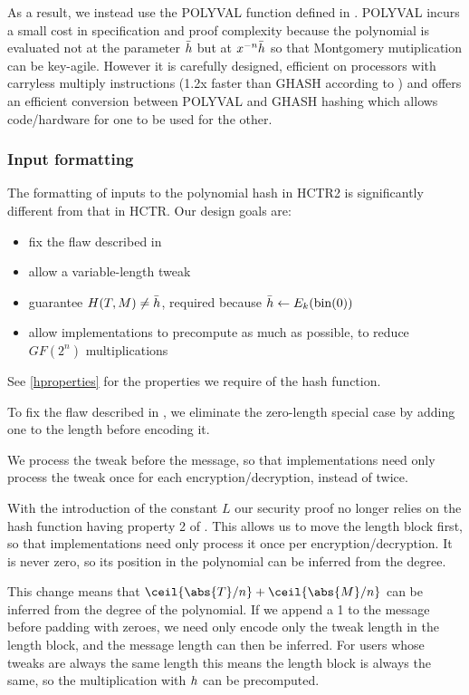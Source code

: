 \documentclass[hctr2.tex]{subfiles}
\begin{document}
As a result, we instead use the POLYVAL function
defined in \cite{aes_gcm_siv,aes_gcm_siv_rfc}.
POLYVAL incurs a small cost in specification and proof complexity because 
the polynomial is evaluated not at the parameter \(\bar{h}\)
but at \(x^{-n}\bar{h}\)
so that Montgomery mutiplication\cite{montmul} can be key-agile.
However it is carefully designed, efficient
on processors with carryless multiply instructions
(1.2x faster than GHASH according to \cite{aes_gcm_siv})
and offers an efficient conversion between POLYVAL and GHASH hashing
which allows code/hardware for one to be used for the other.

\subsubsection{Input formatting}\label{inputformatting}

The formatting of inputs to the polynomial hash in HCTR2 is significantly
different from that in HCTR. Our design goals are:

\begin{itemize}
    \item fix the flaw described in \cite{kumarhctr}
    \item allow a variable-length tweak
    \item guarantee \(H(T, M) \neq \bar{h}\), required
    because \(\bar{h} \gets E_k(\operatorname{bin}(0))\)
    \item allow implementations to precompute as much as possible, to reduce \(GF(2^n)\) multiplications
\end{itemize}

See \autoref{hproperties}
for the properties we require of the hash function.

To fix the flaw described in \cite{kumarhctr},
we eliminate the zero-length special case
by adding one to the length before encoding it.

We process the tweak before the message, so that implementations need only
process the tweak once for each encryption/decryption, instead of twice.

With the introduction of the constant \(L\)
our security proof no longer relies on the hash function
having property 2 of \cite[Section~3.3]{hctr}.
This allows us to move the length block first, so
that implementations need only process it once per encryption/decryption.
It is never zero, so its position in the
polynomial can be inferred from the degree.

This change means that \(\ceil{\abs{T}/n} + \ceil{\abs{M}/n}\)
can be inferred from the degree of the polynomial.  
If we append a 1 to the message before padding with zeroes,
we need only encode only the tweak length in the length block,
and the message length can then be inferred.
For users whose tweaks are always the same length
this means the length block is always the same, 
so the multiplication with \(h\) can be
precomputed.
\end{document}
